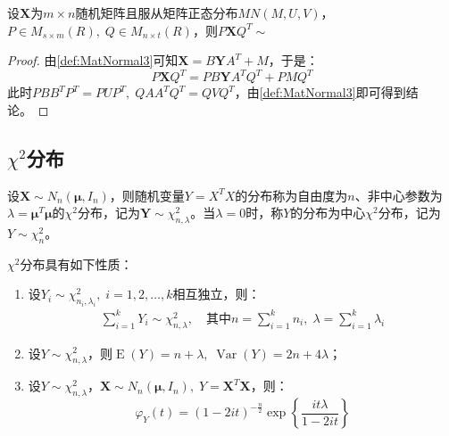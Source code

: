 \begin{theorem}\label{theo:MatNormalLinearTransform}
	设$\mathbf{X}$为$m\times n$随机矩阵且服从矩阵正态分布$MN(M,U,V)$，$P\in M_{s\times m}(R),\;Q\in M_{n\times t}(R)$，则$P\mathbf{X}Q^T\sim$
\end{theorem}
\begin{proof}
	由\cref{def:MatNormal3}可知$\mathbf{X}=B\mathbf{Y}A^T+M$，于是：
	\begin{equation*}
		P\mathbf{X}Q^T=PB\mathbf{Y}A^TQ^T+PMQ^T
	\end{equation*}
	此时$PBB^TP^T=PUP^T,\;QAA^TQ^T=QVQ^T$，由\cref{def:MatNormal3}即可得到结论。
\end{proof}

\subsection{$\chi^2$分布}
\begin{definition}
	设$\mathbf{X}\sim N_n(\boldsymbol{\mu}, I_n)$，则随机变量$Y=X^TX$的分布称为自由度为$n$、非中心参数为$\lambda=\boldsymbol{\mu}^T\boldsymbol{\mu}$的$\chi^2$分布，记为$\mathbf{Y}\sim \chi^2_{n,\lambda}$。当$\lambda=0$时，称$Y$的分布为中心$\chi^2$分布，记为$Y\sim\chi_n^2$。
\end{definition}
\begin{property}\label{prop:Chi2Distribution}
	$\chi^2$分布具有如下性质：
	\begin{enumerate}
		\item 设$Y_i\sim\chi_{n_i,\lambda_i}^2,\;i=1,2,\dots,k$相互独立，则：
		\begin{gather*}
			\sum_{i=1}^{k}Y_i\sim\chi_{n,\lambda}^2,\quad\text{其中}
			n=\sum_{i=1}^{k}n_i,\;\lambda=\sum_{i=1}^{k}\lambda_i
		\end{gather*}
		\item 设$Y\sim\chi_{n,\lambda}^2$，则$\operatorname{E}(Y)=n+\lambda,\;\operatorname{Var}(Y)=2n+4\lambda$；
		\item 设$Y\sim\chi_{n,\lambda}^2$，$\mathbf{X}\sim N_n(\boldsymbol{\mu},I_n),\;Y=\mathbf{X}^T\mathbf{X}$，则：
		\begin{equation*}
			\varphi_{Y}(t)=(1-2it)^{-\frac{n}{2}}\exp\left\{\frac{it\lambda}{1-2it}\right\}
		\end{equation*}
	\end{enumerate}
\end{property}
